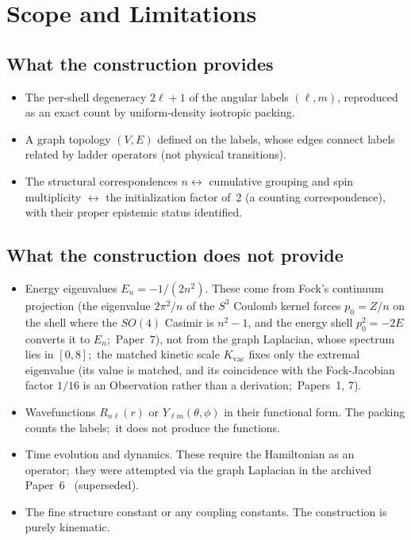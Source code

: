 \documentclass[aps,prl,reprint,amsmath,amssymb]{revtex4-2}
\begin{document}
\section{Scope and Limitations}
\label{sec:scope}

\subsection{What the construction provides}

\begin{itemize}
\item[$\checkmark$] The per-shell degeneracy $2\ell + 1$ of the angular
  labels $(\ell, m)$, reproduced as an exact count by uniform-density
  isotropic packing.

\item[$\checkmark$] A graph topology $(V, E)$ defined on the labels,
  whose edges connect labels related by ladder operators (not physical
  transitions).

\item[$\checkmark$] The structural correspondences $n \leftrightarrow$
  cumulative grouping and spin multiplicity $\leftrightarrow$
  the initialization factor of~2 (a counting correspondence), with
  their proper epistemic status identified.
\end{itemize}

\subsection{What the construction does not provide}

\begin{itemize}
\item[$\times$] Energy eigenvalues $E_n = -1/(2n^2)$.  These come
  from Fock's continuum projection (the eigenvalue $2\pi^2/n$ of the
  $S^3$ Coulomb kernel forces $p_0 = Z/n$ on the shell where the
  $SO(4)$ Casimir is $n^2 - 1$, and the energy shell $p_0^2 = -2E$
  converts it to $E_n$;\ Paper~7), not from the graph Laplacian, whose spectrum lies in
  $[0, 8]$;\ the matched kinetic scale $K_{\mathrm{vac}}$ fixes only the
  extremal eigenvalue (its value is matched, and its coincidence with
  the Fock-Jacobian factor $1/16$ is an Observation rather than a
  derivation;\ Papers~1, 7).

\item[$\times$] Wavefunctions $R_{n\ell}(r)$ or
  $Y_{\ell m}(\theta, \phi)$ in their functional form.  The packing
  counts the labels;\ it does not produce the functions.

\item[$\times$] Time evolution and dynamics.  These require the
  Hamiltonian as an operator;\ they were attempted via the graph
  Laplacian in the archived Paper~6~\cite{paper6} (superseded).

\item[$\times$] The fine structure constant or any coupling constants.
  The construction is purely kinematic.
\end{itemize}
\end{document}
